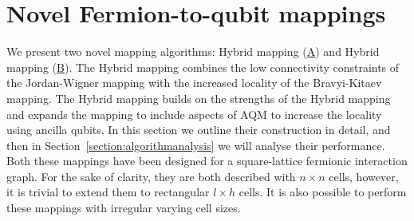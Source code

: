 \documentclass[pdftex,pra,aps,twocolumn,twoside]{revtex4-1}
\theoremstyle{plain}
\theoremstyle{note}
\newcommand\+{{\footnotesize \raisebox{0.3ex}{+}}}
\begin{document}
\section{Novel Fermion-to-qubit mappings}
We present two novel mapping algorithms: Hybrid mapping (\hyperref[section:Hybridmapping]{A}) and Hybrid\+ mapping (\hyperref[section:auxHybridmapping]{B}). The Hybrid mapping combines the low connectivity constraints of the Jordan-Wigner mapping with the increased locality of the Bravyi-Kitaev mapping. The Hybrid\+ mapping builds on the strengths of the Hybrid mapping and expands the mapping to include aspects of AQM \cite{steudtner2019quantum} to increase the locality using ancilla qubits.
In this section we outline their construction in detail, and then in Section~\ref{section:algorithmanalysis} we will analyse their performance. 
Both these mappings have been designed for a square-lattice fermionic interaction graph. For the sake of clarity, they are both described with $n \times n$ cells, however, it is trivial to extend them to rectangular $l \times h$ cells. It is also possible to perform these mappings with irregular varying cell sizes.
\end{document}
